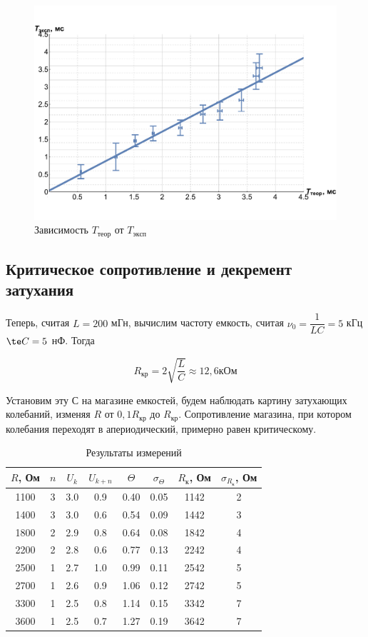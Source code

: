 \documentclass[12pt]{kiarticle} %
\begin{document}
\begin{figure}[h!]
	\includegraphics[scale=0.55]{T.pdf}
	\caption{Зависимость $ T_{теор}$ от $ T_{эксп} $}
\end{figure}

\subsection{Критическое сопротивление и декремент затухания}

Теперь, считая $ L = 200 $ мГн, вычислим  частоту емкость, считая $ \nu_0 = \dfrac{1}{LC} = 5 $ кГц $ \te C = 5  $ нФ. Тогда 
 
 \begin{equation}\label{}
 R_ {кр} = 2 \sqrt{\dfrac{L}{C}} \approx 12,6 кОм
 \end{equation}

Установим эту $ С $ на магазине емкостей, будем наблюдать картину затухающих колебаний, изменяя $ R $ от $ 0,1 R_{кр}$ до $ R_{кр} $. Сопротивление магазина, при котором колебания переходят в апериодический, примерно равен критическому. 

\begin{table}[h!]
	\centering
	\caption{Результаты измерений}
	\begin{tabular}{|c|c|c|c|c|c|c|c|}
		\hline
		$ R $, Ом & $ n $ & $ U_k$ & $ U_{k+n} $& $ \Theta $& $ \sigma_\Theta $ & $ R_к $, Ом & $ \sigma_{R_к} $, Ом \\
		\hline
		1100 & 3 & 3.0 & 0.9 & 0.40 & 0.05 & 1142 & 2 \\
		1400 & 3 & 3.0 & 0.6 & 0.54 & 0.09 & 1442 & 3 \\
		1800 & 2 & 2.9 & 0.8 & 0.64 & 0.08 & 1842 & 4 \\
		2200 & 2 & 2.8 & 0.6 & 0.77 & 0.13 & 2242 & 4 \\
		2500 & 1 & 2.7 & 1.0 & 0.99 & 0.11 & 2542 & 5 \\
		2700 & 1 & 2.6 & 0.9 & 1.06 & 0.12 & 2742 & 5 \\
		3300 & 1 & 2.5 & 0.8 & 1.14 & 0.15 & 3342 & 7 \\
		3600 & 1 & 2.5 & 0.7 & 1.27 & 0.19 & 3642 & 7 \\
		\hline
	\end{tabular}%
	\label{resR}%
\end{table}%
\end{document}
